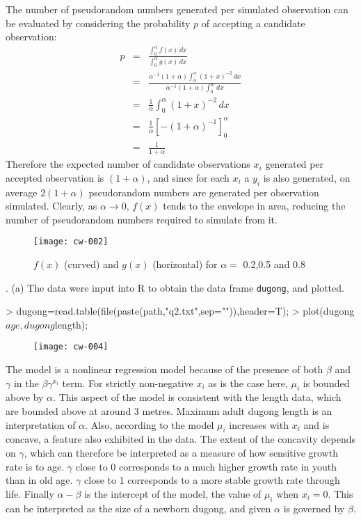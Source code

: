\documentclass[a4paper,11pt]{article}
\begin{document}
The number of pseudorandom numbers generated per simulated observation
can be evaluated by considering the probability $p$ of accepting a
candidate observation:
\begin{eqnarray*}
 p & = &  \frac{\int_0^\alpha \! f(x) \, dx}{\int_0^\alpha \! g(x) \, dx}\\
   & = &  \frac{\alpha^{-1}(1+\alpha) \int_0^\alpha \! (1+x)^{-2} \, dx}
               {\alpha^{-1}(1+\alpha)\int_0^\alpha \!  \, dx} \\
   & = &  \frac{1}{\alpha} \int_0^\alpha \! (1+x)^{-2} \, dx\\
   & = &  \frac{1}{\alpha}\left[-(1+\alpha)^{-1} \right]^\alpha_0 \\
   & = &  \frac{1}{1+\alpha}
\end{eqnarray*}
Therefore the expected number of candidate observations $x_i$ generated per
accepted observation is $(1+\alpha)$, and since for each $x_i$ a
$y_i$ is also generated, on average $2(1+\alpha)$ pseudorandom numbers
are generated per observation simulated. Clearly, as $\alpha \rightarrow
0$, $f(x)$ tends to the envelope in area, reducing the number of
pseudorandom numbers required to simulate from it.

\begin{figure}[h]
\begin{center}
\texttt{[image: cw-002]}
\caption{$f(x)$ (curved) and $g(x)$ (horizontal) for $\alpha=$ 0.2,0.5
and 0.8}
\end{center}
\end{figure}


. (a) The data were input into R to obtain the data frame \texttt{dugong}, and
plotted.
\begin{Schunk}
\begin{Sinput}
> dugong=read.table(file(paste(path,"q2.txt",sep="")),header=T);
> plot(dugong$age,dugong$length);
\end{Sinput}
\end{Schunk}
\begin{figure}[h]
  \begin{center}
\texttt{[image: cw-004]}
\end{center}
\end{figure}
The model is a nonlinear regression model because of the presence of
both $\beta$ and $\gamma$ in the $\beta\gamma^{x_i}$ term. For
strictly non-negative $x_i$ as is the case here, $\mu_i$ is
bounded above by $\alpha$. This aspect of the model is consistent with
the length data, which are bounded above at around 3 metres. Maximum adult dugong
length is an interpretation of $\alpha$. Also, according to the model
$\mu_i$ increases with $x_i$ and is concave, a feature also exhibited in the
data. The extent of the concavity depends on $\gamma$, which can
therefore  be interpreted as a measure of how sensitive growth rate is
to age. $\gamma$ close to 0 corresponds to a much higher growth rate
in youth than in old age. $\gamma$ close to 1 corresponds to a more
stable growth rate through life. Finally $\alpha-\beta$ is the
intercept of the model, the value of $\mu_i$ when $x_i=0$. This can be
interpreted as the size of a newborn dugong, and given $\alpha$ is
governed by $\beta$.
\end{document}
